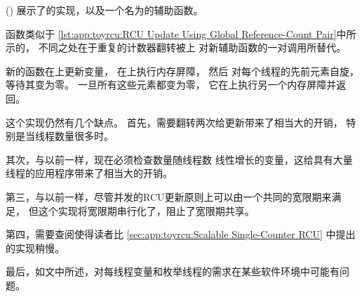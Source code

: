 \begin{listing}

\caption{RCU每线程引用计数对数据}
\label{lst:app:toyrcu:RCU Per-Thread Reference-Count Pair Data}
\end{listing}

\begin{listing}

\caption{使用每线程引用计数对的RCU读端}
\label{lst:app:toyrcu:RCU Read-Side Using Per-Thread Reference-Count Pair}
\end{listing}

\begin{listing}

\caption{使用每线程引用计数对的RCU更新}
\label{lst:app:toyrcu:RCU Update Using Per-Thread Reference-Count Pair}
\end{listing}

()
展示了的实现，以及一个名为的辅助函数。
\begin{fcvref}
函数类似于
\cref{lst:app:toyrcu:RCU Update Using Global Reference-Count Pair}中所示的，
不同之处在于重复的计数器翻转被上
对新辅助函数的一对调用所替代。
\end{fcvref}

\begin{fcvref}
新的函数在上更新变量，
在上执行内存屏障，
然后
对每个线程的先前元素自旋，等待其变为零。
一旦所有这些元素都变为零，
它在上执行另一个内存屏障并返回。
\end{fcvref}

这个实现仍然有几个缺点。
首先，需要翻转两次给更新带来了相当大的开销，
特别是当线程数量很多时。

其次，与以前一样，现在必须检查数量随线程数
线性增长的变量，这给具有大量线程的应用程序带来了相当大的开销。

第三，与以前一样，尽管并发的RCU更新原则上可以由一个共同的宽限期来满足，
但这个实现将宽限期串行化了，阻止了宽限期共享。

第四，需要查阅使得读者比
\cref{sec:app:toyrcu:Scalable Single-Counter RCU}
中提出的实现稍慢。

最后，如文中所述，对每线程变量和枚举线程的需求在某些软件环境中可能有问题。

